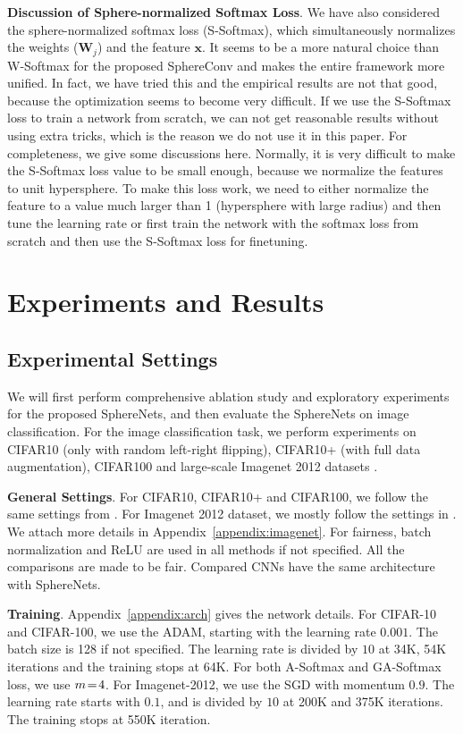 \textbf{Discussion of Sphere-normalized Softmax Loss}. We have also considered the sphere-normalized softmax loss (S-Softmax), which simultaneously normalizes the weights ($\bm{W}_j$) and the feature $\bm{x}$. It seems to be a more natural choice than W-Softmax for the proposed SphereConv and makes the entire framework more unified. In fact, we have tried this and the empirical results are not that good, because the optimization seems to become very difficult. If we use the S-Softmax loss to train a network from scratch, we can not get reasonable results without using extra tricks, which is the reason we do not use it in this paper. For completeness, we give some discussions here. Normally, it is very difficult to make the S-Softmax loss value to be small enough, because we normalize the features to unit hypersphere. To make this loss work, we need to either normalize the feature to a value much larger than 1 (hypersphere with large radius) and then tune the learning rate or first train the network with the softmax loss from scratch and then use the S-Softmax loss for finetuning.

\section{Experiments and Results}

\subsection{Experimental Settings}

We will first perform comprehensive ablation study and exploratory experiments for the proposed SphereNets, and then evaluate the SphereNets on image classification. For the image classification task, we perform experiments on CIFAR10 (only with random left-right flipping), CIFAR10+ (with full data augmentation), CIFAR100 and large-scale Imagenet 2012 datasets \cite{russakovsky2014imagenet}.

\par
\textbf{General Settings}. For CIFAR10, CIFAR10+ and CIFAR100, we follow the same settings from \cite{he2016identity,liu2016large}. For Imagenet 2012 dataset, we mostly follow the settings in \cite{krizhevsky2012imagenet}. We attach more details in Appendix~\ref{appendix:imagenet}. For fairness, batch normalization and ReLU are used in all methods if not specified. All the comparisons are made to be fair. Compared CNNs have the same architecture with SphereNets.

\par
\textbf{Training}. Appendix~\ref{appendix:arch} gives the network details. For CIFAR-10 and CIFAR-100, we use the ADAM, starting with the learning rate $0.001$. The batch size is 128 if not specified. The learning rate is divided by $10$ at 34K, 54K iterations and the training stops at 64K. For both A-Softmax and GA-Softmax loss, we use $\thickmuskip=2mu \medmuskip=2mu m=4$. For Imagenet-2012, we use the SGD with momentum $0.9$. The learning rate starts with $0.1$, and is divided by $10$ at 200K and 375K iterations. The training stops at 550K iteration.

